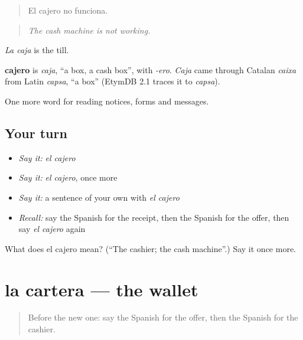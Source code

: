 \begin{quote}
El cajero no funciona.
\end{quote}

\begin{quote}
\emph{The cash machine is not working.}
\end{quote}

\emph{La caja} is the till.

\begin{cousinweb}
\textbf{cajero} is \emph{caja}, \textquotedblleft{}a box, a cash box\textquotedblright{}, with \emph{-ero}. \emph{Caja} came through Catalan \emph{caixa} from Latin \emph{capsa}, \textquotedblleft{}a box\textquotedblright{} (EtymDB 2.1 traces it to \emph{capsa}).
\end{cousinweb}

\begin{grammarlens}[title={What you've built}]
One more word for reading notices, forms and messages.
\end{grammarlens}

\subsection*{Your turn}
\begin{itemize}
\raggedright
  \item \emph{Say it:} \emph{el cajero}
  \item \emph{Say it:} \emph{el cajero}, once more
  \item \emph{Say it:} a sentence of your own with \emph{el cajero}
  \item \emph{Recall:} say the Spanish for the receipt, then the Spanish for the offer, then say \emph{el cajero} again
\end{itemize}

\begin{tcolorbox}[breakable,colback=teal!4,colframe=teal!35!black,title={Before you move on}]
What does el cajero mean? (\textquotedblleft{}The cashier; the cash machine\textquotedblright{}.) Say it once more.
\end{tcolorbox}
\section[la cartera]{la cartera — the wallet}

\label{lesson:ES-C491-cartera}



\begin{quote}
Before the new one: say the Spanish for the offer, then the Spanish for the cashier.
\end{quote}

